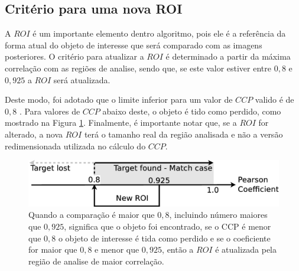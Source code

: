 \subsection{Critério para uma nova ROI}

A $ROI$ é um importante elemento dentro algoritmo, pois ele é a referência da
forma atual do objeto de interesse que será comparado com as imagens posteriores.
O critério para atualizar a $ROI$ é determinado a partir da máxima correlação 
com as regiões de analise, sendo que, se este valor estiver entre $0,8$ 
e $0,925$ a $ROI$ será atualizada.

Deste modo, foi adotado que o limite inferior para um valor de $CCP$ valido é de $0,8$ \cite{Eugene}. Para valores
de $CCP$ abaixo deste, o objeto é tido como perdido, como mostrado na Figura
\ref{fig:newroicri}.
Finalmente, é importante notar que, se a $ROI$ for alterado, a nova $ROI$ terá 
o tamanho real da região analisada e não a versão redimensionada utilizada no cálculo do $CCP$.


\begin{figure}[H]
\includegraphics[width=\columnwidth]{images/figure3.eps}
\caption{Quando a comparação é maior que $0,8$, incluindo número maiores que $0,925$, 
significa que o objeto foi encontrado,
se o CCP é menor que $0,8$ o objeto de interesse é tida como perdido e se o coeficiente for maior que $0,8$ 
e menor que $0,925$, então a $ROI$ é atualizada pela região de analise de 
maior correlação.}
\label{fig:newroicri}
\end{figure}

